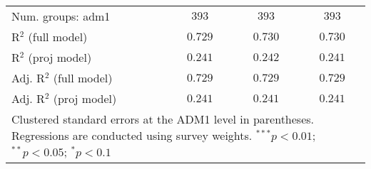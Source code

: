 \begin{table}[htbp]
\begin{center}
\begin{tabular}{l c c c}
Num. groups: adm1                                         & $393$          & $393$          & $393$          \\
R$^2$ (full model)                                        & $0.729$        & $0.730$        & $0.730$        \\
R$^2$ (proj model)                                        & $0.241$        & $0.242$        & $0.241$        \\
Adj. R$^2$ (full model)                                   & $0.729$        & $0.729$        & $0.729$        \\
Adj. R$^2$ (proj model)                                   & $0.241$        & $0.241$        & $0.241$        \\
\hline
\multicolumn{4}{l}{\scriptsize{Clustered standard errors at the ADM1 level in parentheses. Regressions are conducted using survey weights. $^{***}p<0.01$; $^{**}p<0.05$; $^{*}p<0.1$}}
\end{tabular}
\label{main: table5}
\end{center}
\end{table}
